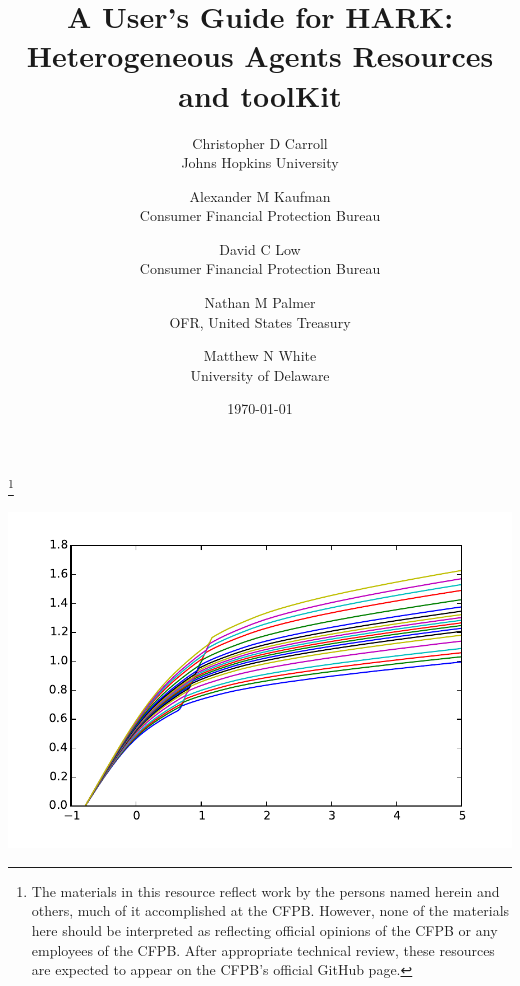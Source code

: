\documentclass[12pt,titlepage,letterpaper]{econtex}
\begin{document}
\title{\LARGE A User's Guide for HARK: \\ Heterogeneous Agents Resources and toolKit}

\date{\normalsize{\today}}

\author{
{Christopher D Carroll\authNum} \\ {\small Johns Hopkins University}
\and
{Alexander M Kaufman\authNum} \\ {\small Consumer Financial Protection Bureau}
\and
{David C Low\authNum} \\ {\small Consumer Financial Protection Bureau}
\and
{Nathan M Palmer\authNum} \\ {\small OFR, United States Treasury}
\and
{Matthew N White\authNum} \\ {\small University of Delaware}
}


\begin{authorsinfo}
\end{authorsinfo}

\thanks{The materials in this resource reflect work by the persons named herein and others, much of it accomplished at the CFPB.  However, none of the materials here should be interpreted as reflecting official opinions of the CFPB or any employees of the CFPB.  After appropriate technical review, these resources are expected to appear on the CFPB's official GitHub page.}

\maketitle

\begin{center}
\includegraphics[scale=0.8]{UserGuidePic.pdf}
\end{center}
\end{document}
